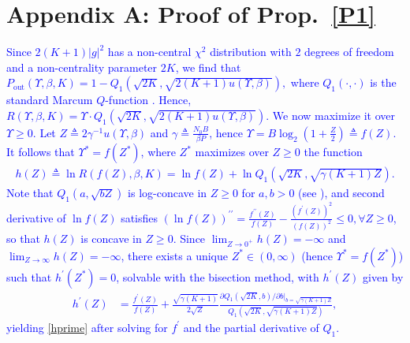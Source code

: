 \documentclass[12pt, draftcls, onecolumn]{IEEEtran}
\theoremstyle{plain}
\theoremstyle{definition}
\theoremstyle{remark}
\newcommand\hlt[1]{\textcolor{blue}{#1}}
\begin{document}
\begin{appendices}\label{S8}
\section*{Appendix A: Proof of Prop.~\ref{P1}}\label{X1}
\hlt{Since $2(K{+}1)|g|^{2}$ has a non-central $\chi^{2}$ distribution with $2$ degrees of freedom and a non-centrality parameter $2K$, we find that $P_{\mathrm{out}}(\Upsilon,\beta,K){=}1{-}Q_{1}(\sqrt{2K},\sqrt{2(K{+}1)u(\Upsilon,\beta)}),$ where $Q_{1}(\cdot,\cdot)$ is the standard Marcum $Q$-function \cite{Rician}. Hence,
$
	R(\Upsilon,\beta,K) = \Upsilon\cdot Q_{1}(\sqrt{2K},\sqrt{2(K + 1)u(\Upsilon,\beta)}).
$
We now maximize it over  $\Upsilon{\geq}0$. Let $Z{\triangleq}2\gamma^{-1}u\left(\Upsilon,\beta\right)$ and $\gamma{\triangleq}\frac{N_{0}B}{\beta P}$, hence $\Upsilon{=}B\log_{2}\left(1{+}\frac{Z}{2}\right){\triangleq}f(Z)$. It follows that $\Upsilon^{*}{=}f\left(Z^{*}\right)$, where $Z^{*}$ maximizes over $Z{\geq}0$ the function
\begin{align}\label{eq:Pout_defn}
    h(Z) \triangleq \ln R(f(Z),\beta,K) = \ln f(Z) + \ln Q_1 (\sqrt{2K}, \sqrt{\gamma(K + 1)Z}).
\end{align}
Note that $Q_{1}\left(a,\sqrt{bZ}\right)$ is log-concave in $Z{\geq}0$ for $a,b{>}0$ (see \cite{MarcumTB}), and second derivative of $\ln f(Z)$ satisfies $(\ln f(Z))^{\prime\prime}{=}\frac{f^{\prime\prime}(Z)}{f(Z)}{-}\frac{(f^{\prime}(Z))^{2}}{(f(Z))^2}{\leq}0,{\forall}Z{\geq}0$, so that $h(Z)$ is concave in $Z{\geq}0$. Since $\lim_{Z{\to}0^{+}}h(Z){=}-\infty$ and $\lim_{Z{\to}\infty}h(Z){=}-\infty$, there exists a unique $Z^{*}{\in}(0,\infty)$ (hence $\Upsilon^{*}{=}f\left(Z^{*}\right)$) such that $h^{\prime}(Z^{*}){=}0$, solvable with the bisection method, with $h^{\prime}(Z)$ given by
\begin{align}
    \nonumber
    h^\prime(Z) &= \frac{f^\prime(Z)}{f(Z)} + \frac{\sqrt{\gamma(K + 1)}}{2\sqrt{Z}}\frac{\partial Q_1(\sqrt{2K},b)/\partial b\big|_{b=\sqrt{\gamma(K + 1)Z}}}{Q_1(\sqrt{2K},\sqrt{\gamma(K + 1)Z})},
\end{align}
yielding \eqref{hprime} after solving for $f^{\prime}$ and the partial derivative of $Q_{1}$.}
\vspace{-4mm}


\end{appendices}
\end{document}
